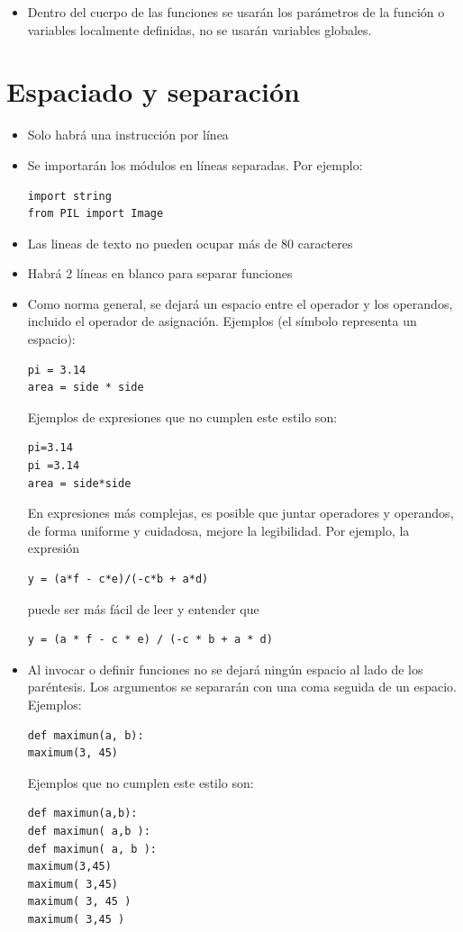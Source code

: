 \documentclass{article}
\newcommand{\code}[1]{\lstinline{#1}}
\begin{document}
\begin{itemize}

\item  Dentro del cuerpo de las funciones se usarán los parámetros de la función o variables localmente definidas, no se usarán variables globales.
\end{itemize}


\section{Espaciado y separación}
\begin{itemize}
\item Solo habrá una instrucción por línea
\item Se importarán los módulos en líneas separadas. Por ejemplo:
\begin{lstlisting}
import string
from PIL import Image
\end{lstlisting}
\item Las lineas de texto no pueden ocupar más de 80 caracteres

\item Habrá 2 líneas en blanco para separar funciones

\item Como norma general, se dejará un espacio entre el operador y los operandos, incluido el operador de asignación. Ejemplos (el símbolo \texttt{} representa un espacio):
\begin{lstlisting}[showspaces=true]
pi = 3.14
area = side * side
\end{lstlisting}
Ejemplos de expresiones que no cumplen este estilo son:
\begin{lstlisting}[showspaces=true]
pi=3.14
pi =3.14
area = side*side
\end{lstlisting}
En expresiones más complejas, es posible que juntar operadores y operandos, de forma uniforme y cuidadosa, mejore la legibilidad. Por ejemplo, la expresión 
 \begin{lstlisting}[showspaces=true]
y = (a*f - c*e)/(-c*b + a*d)
\end{lstlisting}
puede ser más fácil de leer y entender que 
\begin{lstlisting}[showspaces=true]
y = (a * f - c * e) / (-c * b + a * d)
\end{lstlisting}

\item Al invocar o definir funciones no se dejará ningún espacio al lado de los paréntesis. Los argumentos se separarán con una coma seguida de un espacio. Ejemplos:
\begin{lstlisting}[showspaces=true]
def maximun(a, b):
maximum(3, 45)
\end{lstlisting}
Ejemplos que no cumplen este estilo son:
\begin{lstlisting}[showspaces=true]
def maximun(a,b):
def maximun( a,b ):
def maximun( a, b ):
maximum(3,45)
maximum( 3,45)
maximum( 3, 45 )
maximum( 3,45 )
\end{lstlisting}
\end{itemize}
\end{document}
